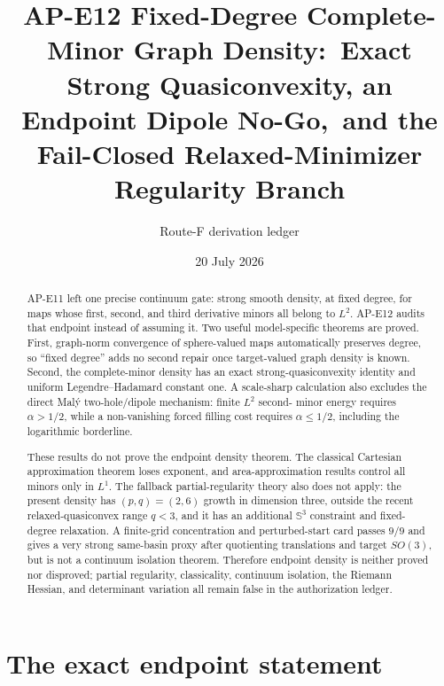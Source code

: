 \documentclass[11pt]{article}
\title{AP-E12 Fixed-Degree Complete-Minor Graph Density:\
Exact Strong Quasiconvexity, an Endpoint Dipole No-Go,\
and the Fail-Closed Relaxed-Minimizer Regularity Branch}
\author{Route-F derivation ledger}
\date{20 July 2026}
\begin{document}
\maketitle

\begin{abstract}
AP-E11 left one precise continuum gate: strong smooth density, at fixed
degree, for maps whose first, second, and third derivative minors all belong
to $L^2$.  AP-E12 audits that endpoint instead of assuming it.  Two useful
model-specific theorems are proved.  First, graph-norm convergence of
sphere-valued maps automatically preserves degree, so ``fixed degree'' adds
no second repair once target-valued graph density is known.  Second, the
complete-minor density has an exact strong-quasiconvexity identity and
uniform Legendre--Hadamard constant one.  A scale-sharp calculation also
excludes the direct Mal\'y two-hole/dipole mechanism: finite $L^2$ second-
minor energy requires $\alpha>1/2$, while a non-vanishing forced filling cost
requires $\alpha\leq1/2$, including the logarithmic borderline.

These results do not prove the endpoint density theorem.  The classical
Cartesian approximation theorem loses exponent, and area-approximation
results control all minors only in $L^1$.  The fallback partial-regularity
theory also does not apply: the present density has $(p,q)=(2,6)$ growth in
dimension three, outside the recent relaxed-quasiconvex range $q<3$, and it
has an additional $\mathbb S^3$ constraint and fixed-degree relaxation.  A
finite-grid concentration and perturbed-start card passes $9/9$ and gives a
very strong same-basin proxy after quotienting translations and target
$SO(3)$, but is not a continuum isolation theorem.  Therefore endpoint
density is neither proved nor disproved; partial regularity, classicality,
continuum isolation, the Riemann Hessian, and determinant variation all
remain false in the authorization ledger.
\end{abstract}

\tableofcontents

\section{The exact endpoint statement}
\end{document}
